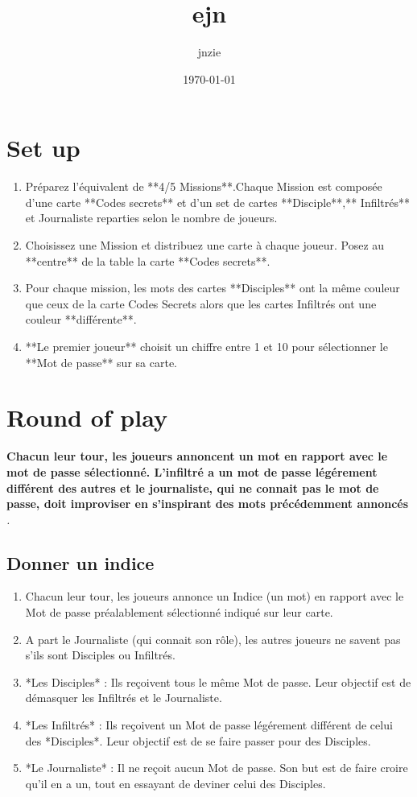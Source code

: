 \documentclass{article}%
\title{ejn}%
\author{jnzie}%
\date{\today}%
\begin{document}
%
\pagestyle{empty}%
\normalsize%
\maketitle%
\section{ Set up
}%
\label{sec:Setup}%
\begin{enumerate}%
\item%
 Préparez l'équivalent de **4/5 Missions**.Chaque Mission est composée d'une carte **Codes secrets** et d'un set de cartes **Disciple**,** Infiltrés** et Journaliste reparties selon le nombre de joueurs.
%
\item%
 Choisissez une Mission et distribuez une carte à chaque joueur. Posez au **centre** de la table la carte **Codes secrets**.
%
\item%
 Pour chaque mission, les mots des cartes **Disciples** ont la même couleur que ceux de la carte Codes Secrets alors que les cartes Infiltrés ont une couleur **différente**.
%
\item%
 **Le premier joueur** choisit un chiffre entre 1 et 10 pour sélectionner le **Mot de passe** sur sa carte.
%
\end{enumerate}

%
\section{ Round of play
}%
\label{sec:Roundofplay}%
\textbf{Chacun leur tour, les joueurs annoncent un mot en rapport avec le mot de passe sélectionné. L'infiltré a un mot de passe légérement différent des autres et le journaliste, qui ne connait pas le mot de passe, doit improviser en s'inspirant des mots précédemment annoncés}%
\textit{.
}

%
\subsection{ Donner un indice
}%
\label{subsec:Donnerunindice}%
\begin{enumerate}%
\item%
 Chacun leur tour, les joueurs annonce un Indice (un mot) en rapport avec le Mot de passe préalablement sélectionné indiqué sur leur carte.
%
\item%
 A part le Journaliste (qui connait son rôle), les autres joueurs ne savent pas s'ils sont Disciples ou Infiltrés.
%
\item%
 *Les Disciples* : Ils reçoivent tous le même Mot de passe. Leur objectif est de démasquer les Infiltrés et le Journaliste.
%
\item%
 *Les Infiltrés* : Ils reçoivent un Mot de passe légérement différent de celui des *Disciples*. Leur objectif est de se faire passer pour des Disciples.
%
\item%
 *Le Journaliste* : Il ne reçoit aucun Mot de passe. Son but est de faire croire qu'il en a un, tout en essayant de deviner celui des Disciples.
%
\end{enumerate}
\end{document}
